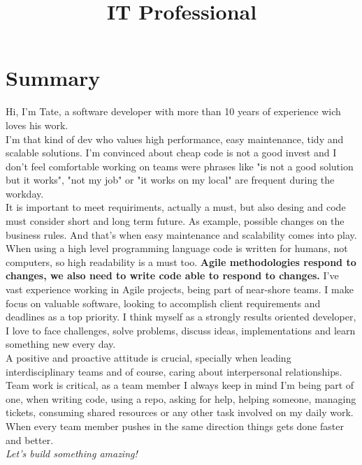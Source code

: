 \documentclass[11pt,a4paper,sans]{moderncv}        %
\title{IT Professional}                               %
\begin{document}
\makecvtitle

\section{Summary}

Hi, I'm Tate, a software developer with more than 10 years of experience wich loves his work.\\
I'm that kind of dev who values high performance, easy maintenance, tidy and scalable solutions.
I'm convinced about cheap code is not a good invest and I don't feel comfortable working on teams were phrases like "is not a
good solution but it works", "not my job" or "it works on my local" are frequent during the workday.\\
It is important to meet requiriments, actually a must, but also desing and code must consider short and long term future.
As example, possible changes on the business rules. And that's when easy maintenance and scalability comes into play.
When using a high level programming language code is written for humans, not computers, so high readability is a must too.
\textbf{Agile methodologies respond to changes, we also need to write code able to respond to changes.}
I've vast experience working in Agile projects, being part of near-shore teams.
I make focus on valuable software, looking to accomplish client requirements and deadlines as a top priority.
I think myself as a strongly results oriented developer, I love to face challenges, solve problems, discuss ideas, implementations and learn something new every day.\\
A positive and proactive attitude is crucial, specially when leading interdisciplinary teams and of course,
caring about interpersonal relationships.\\
Team work is critical, as a team member I always keep in mind I'm being part of one, when writing code, using a repo,
asking for help, helping someone, managing tickets, consuming shared resources or any other task involved on my daily work.
When every team member pushes in the same direction things gets done faster and better.\\
\textit{Let's build something amazing!}\\
\end{document}
